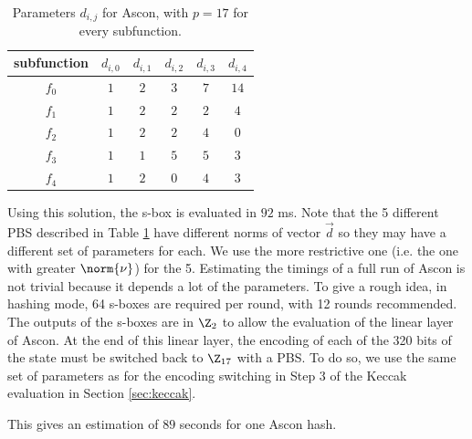 \begin{table}[]
    \centering
    \begin{tabular}{|c|c|c|c|c|c|}
        \hline
       subfunction & $d_{i, 0}$ & $d_{i, 1}$ & $d_{i, 2}$ & $d_{i, 3}$ & $d_{i, 4}$\\
        \hline
        $f_0$  & $1$ & $2$ & $3$ & $7$ & $14$\\
        \hline
        $f_1$ & $1$ & $2$ & $2$ & $2$ & $4$\\
        \hline
        $f_2$ & $1$ & $2$ & $2$ & $4$ & $0$\\
        \hline
        $f_3$ & $1$ & $1$ & $5$ & $5$ & $3$\\
        \hline
        $f_4$ & $1$ & $2$ & $0$ & $4$ & $3$\\
        \hline
     \end{tabular}
    \caption{Parameters $d_{i, j}$ for Ascon, with $p=17$ for every subfunction.}
    \label{tab:encodings_ascon}
\end{table}


Using this solution, the s-box is evaluated in $92$ ms. Note that the 5 different PBS described in Table \ref{tab:encodings_ascon} have different norms of vector $\vec d$ so they may have a different set of parameters for each. We use the more restrictive one (i.e. the one with greater $\norm{\nu}$) for the 5. Estimating the timings of a full run of Ascon is not trivial because it depends a lot of the parameters. To give a rough idea, in hashing mode, 64 s-boxes are required per round, with 12 rounds recommended. The outputs of the s-boxes are in $\Z_2$ to allow the evaluation of the linear layer of Ascon. At the end of this linear layer, the encoding of each of the 320 bits of the state must be switched back to $\Z_{17}$ with a PBS. To do so, we use the same set of parameters as for the encoding switching in Step 3 of the Keccak evaluation in Section \ref{sec:keccak}.

This gives an estimation of $89$ seconds for one Ascon hash.

